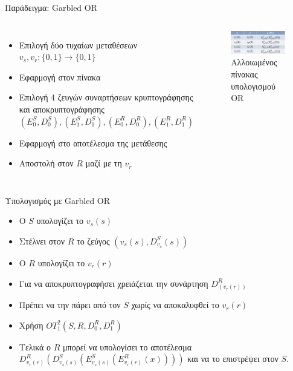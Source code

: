 \documentclass[handout]{beamer}
\begin{document}
\begin{frame}{Παράδειγμα: Garbled OR}
	\begin{columns}
		\begin{itemize}
			\item Επιλογή δύο τυχαίων μεταθέσεων $v_s, v_r : \{0,1\} \rightarrow \{0,1\} $ 
			\item Εφαρμογή στον πίνακα
			\item Επιλογή 4 ζευγών συναρτήσεων κρυπτογράφησης και αποκρυπτογράφησης 
			$(E_0^S, D_0^S), (E_1^S, D_1^S), (E_0^R, D_0^R), (E_1^R, D_1^R)$
			\item Εφαρμογή στο αποτέλεσμα της μετάθεσης
			\item Αποστολή στον $R$ μαζί με τη $v_r$
		\end{itemize}
		\begin{figure}
			\centering
			\includegraphics[width=1.2\textwidth]{ot_garbled_or.png}
			\caption{Αλλοιωμένος πίνακας υπολογισμού OR}
		\end{figure}
	\end{columns}	
\end{frame}

\begin{frame}{Υπολογισμός με Garbled OR}
	\begin{itemize}
		\item Ο $S$ υπολογίζει το $v_s(s)$ 
		\item Στέλνει στον $R$ το ζεύγος $(v_s(s),D_{v_s}^{S}(s))$
		\item O $R$ υπολογίζει το $v_r(r)$
		\item Για να αποκρυπτογραφήσει χρειάζεται την συνάρτηση $D_{(v_r(r))}^R$
		\item Πρέπει να την πάρει από τον $S$ \alert{χωρίς} να αποκαλυφθεί το $v_r(r)$
		\item Χρήση ${OT}_1^2(S,R,D_0^R,D_1^R)$
		\item Τελικά ο $R$ μπορεί να υπολογίσει το αποτέλεσμα $D^R_{v_r(r)}(D^S_{v_s(s)}(E^S_{v_s(s)}(E^R_{v_r(r)}(x))))$ και να το επιστρέψει στον $S$.
	\end{itemize}
\end{frame}
\end{document}

